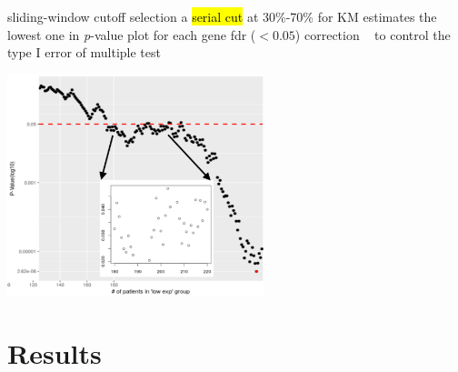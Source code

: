 \documentclass[
paper=landscape,
paper=160mm:90mm, %
fontsize=11pt, %
pagesize, %
parskip=half-, %
]{scrartcl} %
\theoremstyle{mythmstyle} %
\begin{document}
\begin{minipage}[c]{0.45\linewidth}

\begin{outline}

\1 sliding-window cutoff selection
    \2 a \hl{serial cut} at 30\%-70\% for KM estimates
    \2 the lowest one in \textit{p}-value plot for each gene
\2  \acrfull{fdr} ($ < 0.05$) correction {\tiny ~\autocite{Benjamini1995a}} to control the type I error of multiple test 


\end{outline}
\end{minipage}
\begin{minipage}[c]{0.35\linewidth}
\includegraphics[width=7.5cm]{Rplot_pvaluePlot_NDFIP1.pdf}
\end{minipage}



\clearpage



\section{Results} %


\clearpage

\thispagestyle{headings}
\end{document}
